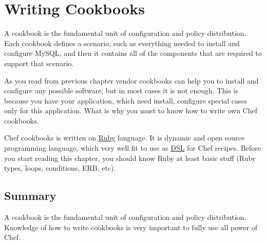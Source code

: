 \chapter{Writing Cookbooks}

A cookbook is the fundamental unit of configuration and policy distribution. Each cookbook defines a scenario, such as everything needed to install and configure MySQL, and then it contains all of the components that are required to support that scenario.

As you read from previous chapter vendor cookbooks can help you to install and configure any possible software, but in most cases it is not enough. This is because you have your application, which need install, configure special cases only for this application. What is why you must to know how to write own Chef cookbooks.

Chef cookbooks is written on \href{https://www.ruby-lang.org}{Ruby} language. It is dynamic and open source programming language, which very well fit to use as \href{http://en.wikipedia.org/wiki/Domain-specific\_language}{DSL} for Chef recipes. Before you start reading this chapter, you should know Ruby at least basic stuff (Ruby types, loops, conditions, ERB, etc).












\section{Summary}

A cookbook is the fundamental unit of configuration and policy distribution. Knowledge of how to write cookbooks is very important to fully use all power of Chef.
